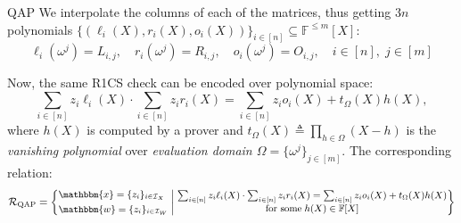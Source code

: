 \documentclass{zkdl-presentation-template}
\begin{document}
    \begin{frame}{QAP}
        We interpolate the columns of each of the matrices, thus getting $3n$
        polynomials $\{(\ell_i(X),r_i(X),o_i(X))\}_{i \in [n]} \subseteq
        \mathbb{F}^{\leq m}[X]$:
        \begin{equation*}
            \ell_i(\omega^j) = L_{i,j}, \quad r_i(\omega^j) = R_{i,j}, \quad o_i(\omega^j) = O_{i,j}, \quad i \in [n], \; j \in [m]
        \end{equation*}

        \pause Now, the same R1CS check can be encoded over polynomial space:
        \begin{equation*}
            \sum_{i \in [n]}z_i\ell_i(X) \cdot \sum_{i \in [n]} z_ir_i(X) = \sum_{i \in [n]}z_io_i(X) + t_{\Omega}(X)h(X),
        \end{equation*}
        where $h(X)$ is computed by a prover and $t_{\Omega}(X) \triangleq
        \prod_{h \in \Omega}(X-h)$ is the \textit{vanishing polynomial} over
        \textit{evaluation domain $\Omega = \{\omega^j\}_{j \in [m]}$}. The 
        corresponding relation:\pause
        \begin{equation*}
            \small\mathcal{R}_{\text{QAP}} = \left\{ 
        \begin{aligned}
            &\mathbbm{x} = \{z_i\}_{i \in \mathcal{I}_{X}} \\
            &\mathbbm{w} = \{z_i\}_{i \in \mathcal{I}_{W}}
        \end{aligned}
        \; \middle| \; 
        \begin{matrix}
            \sum_{i \in [n]}z_i\ell_i(X) \cdot \sum_{i \in [n]}z_ir_i(X) = \sum_{i \in [n]}z_io_i(X) + t_{\Omega}(X)h(X) \\
            \text{for some} \; h(X) \in \mathbb{F}[X]
        \end{matrix}
    \right\}
        \end{equation*}
    \end{frame}
\end{document}
